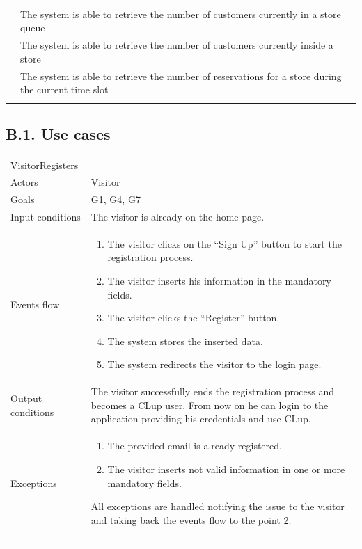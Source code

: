 \begin{longtable}[]{@{}
  >{\raggedright\arraybackslash}p{}
  >{\raggedright\arraybackslash}p{}@{}}
\Copy{R31}{R31 & The system is able to retrieve the number of customers currently in a store queue \\ \addlinespace}
\Copy{R32}{R32 & The system is able to retrieve the number of customers currently inside a store \\ \addlinespace}
\Copy{R33}{R33 & The system is able to retrieve the number of reservations for a store during the current time slot \\ \addlinespace}
\bottomrule
\end{longtable}

\clearpage
\subsection{B.1. Use cases}

\footnotesize
\begin{longtable}[]{@{}
  >{\raggedright\arraybackslash}p{}
  >{\raggedright\arraybackslash}p{}@{}}
\toprule
VisitorRegisters & \\ \addlinespace
\midrule
\endhead
Actors & Visitor \\ \addlinespace
Goals & G1, G4, G7 \\ \addlinespace
Input conditions & The visitor is already on the home page. \\ \addlinespace
Events flow & \begin{enumerate}\vspace{-1.35\baselineskip}
    \item The visitor clicks on the ``Sign Up'' button to start the registration process.
    \item The visitor inserts his information in the mandatory fields.
    \item The visitor clicks the ``Register'' button.
    \item The system stores the inserted data.
    \item The system redirects the visitor to the login page.
\vspace{-1.0\baselineskip}\end{enumerate} \\ \addlinespace
Output conditions & The visitor successfully ends the registration process and becomes a CLup user. From now on he can login to the application providing his credentials and use CLup. \\ \addlinespace
Exceptions & \begin{enumerate}\vspace{-1.35\baselineskip}
    \item The provided email is already registered.
    \item The visitor inserts not valid information in one or more mandatory fields.
\end{enumerate}
All exceptions are handled notifying the issue to the visitor and taking back the events flow to the point 2. \\ \addlinespace
\bottomrule
\end{longtable}

